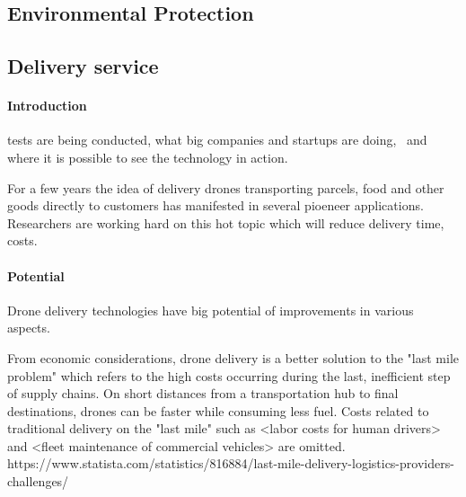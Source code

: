 

\subsection{Environmental Protection}

\subsection{Delivery service} \cite{Watts2012}


\paragraph{Introduction}
tests are being conducted, 
what big companies and startups are doing, \
and where it is possible to see the technology in action.


For a few years the idea of 
delivery drones transporting parcels, food and other goods
directly to customers
has manifested in several pioeneer applications. 
Researchers are working hard on this hot topic
which will reduce delivery time,
costs.

\paragraph{Potential}
Drone delivery technologies have big potential
of improvements in various aspects.

From economic considerations,
drone delivery is a better solution to the "last mile problem"
which refers to the high costs occurring during the last, inefficient step of supply chains.
On short distances from a transportation hub to final destinations,
drones can be faster while consuming less fuel. Costs related
to traditional delivery on the "last mile" such as
<labor costs for human drivers> and <fleet maintenance of commercial vehicles>
are omitted.
https://www.statista.com/statistics/816884/last-mile-delivery-logistics-providers-challenges/

